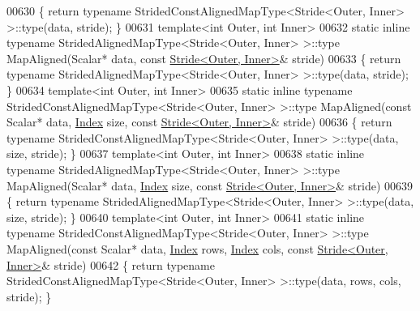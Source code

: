 \begin{DoxyCode}
00630     \{ \textcolor{keywordflow}{return} \textcolor{keyword}{typename} StridedConstAlignedMapType<Stride<Outer, Inner> >::type(data, stride); \}
00631     \textcolor{keyword}{template}<\textcolor{keywordtype}{int} Outer, \textcolor{keywordtype}{int} Inner>
00632     \textcolor{keyword}{static} \textcolor{keyword}{inline} \textcolor{keyword}{typename} StridedAlignedMapType<Stride<Outer, Inner> >::type MapAligned(Scalar* data, \textcolor{keyword}{
      const} \hyperlink{group___core___module_class_eigen_1_1_stride}{Stride<Outer, Inner>}& stride)
00633     \{ \textcolor{keywordflow}{return} \textcolor{keyword}{typename} StridedAlignedMapType<Stride<Outer, Inner> >::type(data, stride); \}
00634     \textcolor{keyword}{template}<\textcolor{keywordtype}{int} Outer, \textcolor{keywordtype}{int} Inner>
00635     \textcolor{keyword}{static} \textcolor{keyword}{inline} \textcolor{keyword}{typename} StridedConstAlignedMapType<Stride<Outer, Inner> >::type MapAligned(\textcolor{keyword}{const} Scalar*
       data, \hyperlink{namespace_eigen_a62e77e0933482dafde8fe197d9a2cfde}{Index} size, \textcolor{keyword}{const} \hyperlink{group___core___module_class_eigen_1_1_stride}{Stride<Outer, Inner>}& stride)
00636     \{ \textcolor{keywordflow}{return} \textcolor{keyword}{typename} StridedConstAlignedMapType<Stride<Outer, Inner> >::type(data, size, stride); \}
00637     \textcolor{keyword}{template}<\textcolor{keywordtype}{int} Outer, \textcolor{keywordtype}{int} Inner>
00638     \textcolor{keyword}{static} \textcolor{keyword}{inline} \textcolor{keyword}{typename} StridedAlignedMapType<Stride<Outer, Inner> >::type MapAligned(Scalar* data, 
      \hyperlink{namespace_eigen_a62e77e0933482dafde8fe197d9a2cfde}{Index} size, \textcolor{keyword}{const} \hyperlink{group___core___module_class_eigen_1_1_stride}{Stride<Outer, Inner>}& stride)
00639     \{ \textcolor{keywordflow}{return} \textcolor{keyword}{typename} StridedAlignedMapType<Stride<Outer, Inner> >::type(data, size, stride); \}
00640     \textcolor{keyword}{template}<\textcolor{keywordtype}{int} Outer, \textcolor{keywordtype}{int} Inner>
00641     \textcolor{keyword}{static} \textcolor{keyword}{inline} \textcolor{keyword}{typename} StridedConstAlignedMapType<Stride<Outer, Inner> >::type MapAligned(\textcolor{keyword}{const} Scalar*
       data, \hyperlink{namespace_eigen_a62e77e0933482dafde8fe197d9a2cfde}{Index} rows, \hyperlink{namespace_eigen_a62e77e0933482dafde8fe197d9a2cfde}{Index} cols, \textcolor{keyword}{const} \hyperlink{group___core___module_class_eigen_1_1_stride}{Stride<Outer, Inner>}& stride)
00642     \{ \textcolor{keywordflow}{return} \textcolor{keyword}{typename} StridedConstAlignedMapType<Stride<Outer, Inner> >::type(data, rows, cols, stride); \}

\end{DoxyCode}
